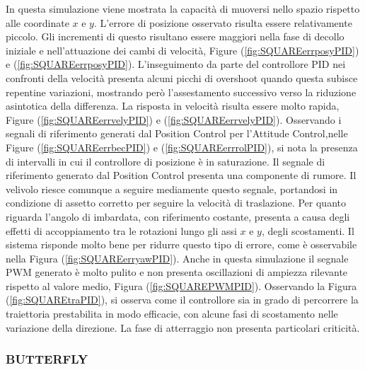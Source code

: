 In questa simulazione viene mostrata la capacità di muoversi nello spazio rispetto alle coordinate $x$ e $y$. L'errore di posizione osservato risulta essere relativamente piccolo. Gli incrementi di questo risultano essere maggiori nella fase di decollo iniziale e nell'attuazione dei cambi di velocità, Figure (\ref{fig:SQUAREerrposyPID}) e (\ref{fig:SQUAREerrposyPID}). L'inseguimento da parte del controllore PID nei confronti della velocità presenta alcuni picchi di overshoot quando questa subisce repentine variazioni, mostrando però l'assestamento successivo verso la riduzione asintotica della differenza. La risposta in velocità risulta essere molto rapida, Figure (\ref{fig:SQUAREerrvelyPID}) e (\ref{fig:SQUAREerrvelyPID}). Osservando i segnali di riferimento generati dal Position Control per l'Attitude Control,nelle Figure (\ref{fig:SQUAREerrbecPID}) e (\ref{fig:SQUAREerrrolPID}), si nota la presenza di intervalli in cui il controllore di posizione è in saturazione. Il segnale di riferimento generato dal Position Control presenta una componente di rumore. Il velivolo riesce comunque a seguire mediamente questo segnale, portandosi in condizione di assetto corretto per seguire la velocità di traslazione. Per quanto riguarda l'angolo di imbardata, con riferimento costante, presenta a causa degli effetti di accoppiamento tra le rotazioni lungo gli assi $x$ e $y$, degli scostamenti. Il sistema risponde molto bene per ridurre questo tipo di errore, come è osservabile nella Figura (\ref{fig:SQUAREerryawPID}). Anche in questa simulazione il segnale PWM generato è molto pulito e non presenta oscillazioni di ampiezza rilevante rispetto al valore medio, Figura (\ref{fig:SQUAREPWMPID}). Osservando la Figura (\ref{fig:SQUAREtraPID}), si osserva come il controllore sia in grado di percorrere la traiettoria prestabilita in modo efficacie, con alcune fasi di scostamento nelle variazione della direzione. La fase di atterraggio non presenta particolari criticità.

\subsubsection{BUTTERFLY}

